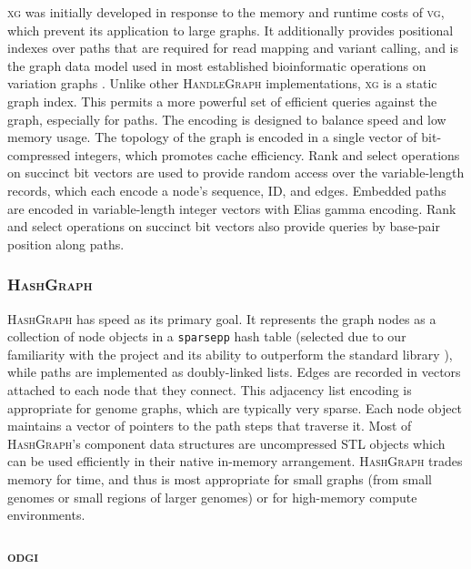 \documentclass{bioinfo}
\begin{document}
\begin{methods}
\textsc{xg} was initially developed in response to the memory and runtime costs of \textsc{vg}, which prevent its application to large graphs.
It additionally provides positional indexes over paths that are required for read mapping and variant calling, and is the graph data model used in most established bioinformatic operations on variation graphs \citep{Garrison_2018,hickey2020genotyping}.
Unlike other \textsc{HandleGraph} implementations, \textsc{xg} is a static graph index.
This permits a more powerful set of efficient queries against the graph, especially for paths.
The encoding is designed to balance speed and low memory usage.
The topology of the graph is encoded in a single vector of bit-compressed integers, which promotes cache efficiency.
Rank and select operations on succinct bit vectors are used to provide random access over the variable-length records, which each encode a node's sequence, ID, and edges.
Embedded paths are encoded in variable-length integer vectors with Elias gamma encoding.
Rank and select operations on succinct bit vectors also provide queries by base-pair position along paths.

\subsubsection{\textsc{HashGraph}}

\textsc{HashGraph} has speed as its primary goal.
It represents the graph nodes as a collection of node objects in a \texttt{sparsepp} hash table (selected due to our familiarity with the project and its ability to outperform the standard library \citep{brehm2019hash}), while paths are implemented as doubly-linked lists.
Edges are recorded in vectors attached to each node that they connect.
This adjacency list encoding is appropriate for genome graphs, which are typically very sparse.
Each node object maintains a vector of pointers to the path steps that traverse it.
Most of \textsc{HashGraph}'s component data structures are uncompressed STL objects which can be used efficiently in their native in-memory arrangement.
\textsc{HashGraph} trades memory for time, and thus is most appropriate for small graphs (from small genomes or small regions of larger genomes) or for high-memory compute environments.

\subsubsection{\textsc{odgi}}


\end{methods}
\end{document}
